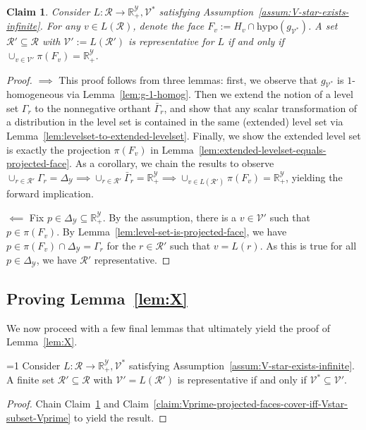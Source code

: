 \documentclass[twoside,11pt]{article}
\newcommand{\Comments}{1}
\newcommand{\mynote}[2]{\ifnum\Comments=1\textcolor{#1}{#2}\fi}
\newcommand{\mytodo}[2]{\ifnum\Comments=1%
  \todo[linecolor=#1!80!black,backgroundcolor=#1,bordercolor=#1!80!black]{#2}\fi}
\newcommand{\raf}[1]{\mynote{darkgreen}{[RF: #1]}}
\newcommand{\btw}[1]{\mytodo{gray!20!white}{BTW: #1}}%
\newcommand{\reals}{\mathbb{R}}
\newcommand{\simplex}{\Delta_\Y}
\newcommand{\R}{\mathcal{R}}
\newcommand{\V}{\mathcal{V}}
\newcommand{\Y}{\mathcal{Y}}
\newcommand{\hyp}{\mathrm{hypo}}
\newtheorem{claim}{Claim}
\begin{document}
\begin{claim}\label{claim:projected-faces-cover-RY-iff-representative}
	Consider $L : \R \to \reals^\Y_+, \V^*$ satisfying Assumption~\ref{assum:V-star-exists-infinite}.
	For any $v \in L(\R)$, denote the face $F_v := H_v \cap \hyp(g_{\V^*})$.
	A set $\R' \subseteq \R$ with $\V' := L(\R')$ is representative for $L$ if and only if $\cup_{v \in \V'} \pi(F_v) = \reals^\Y_+$.  
\end{claim}
\begin{proof}
	$\implies$
	This proof follows from three lemmas: first, we observe that $g_{\V^*}$ is $1$-homogeneous via Lemma~\ref{lem:g-1-homog}.
	Then we extend the notion of a level set $\Gamma_r$ to the nonnegative orthant $\bar \Gamma_r$, and show that any scalar transformation of a distribution in the level set is contained in the same (extended) level set via Lemma~\ref{lem:levelset-to-extended-levelset}.
	Finally, we show the extended level set is exactly the projection $\pi(F_v)$ in Lemma~\ref{lem:extended-levelset-equals-projected-face}.
	As a corollary, we chain the results to observe $\cup_{r \in \R'} \Gamma_r = \simplex \implies \cup_{r \in \R'} \bar \Gamma_r = \reals_+^\Y \implies \cup_{v \in L(\R')}\pi(F_v) = \reals^\Y_+$, yielding the forward implication.
	
	
	$\impliedby$
	Fix $p \in \simplex \subseteq \reals^\Y_+$.
	By the assumption, there is a $v \in \V'$ such that $p \in \pi(F_v)$.
	By Lemma~\ref{lem:level-set-is-projected-face}, we have $p \in \pi(F_v) \cap \simplex = \Gamma_r$ for the $r \in \R'$ such that $v = L(r)$.
	As this is true for all $p \in \simplex$, we have $\R'$ representative.
	
	
\end{proof}

\subsection{Proving Lemma~\ref{lem:X}}\label{subsec:lem-X-proof}
We now proceed with a few final lemmas that ultimately yield the proof of Lemma~\ref{lem:X}.

\begin{lemma}\label{lem:lemX1-rep-iff-subset-vectors}
	\btw{(1)}
	Consider $L : \R \to \reals^\Y_+, \V^*$ satisfying Assumption~\ref{assum:V-star-exists-infinite}.
	A finite set $\R' \subseteq \R$ with $\V' = L(\R')$ is representative if and only if $\V^* \subseteq \V'$.
\end{lemma}
\begin{proof}
	Chain Claim~\ref{claim:projected-faces-cover-RY-iff-representative} and Claim~\ref{claim:Vprime-projected-faces-cover-iff-Vstar-subset-Vprime} to yield the result.
\end{proof}
\end{document}
